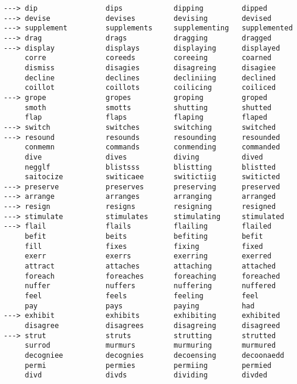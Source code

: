 \begin{lstlisting}
---> dip            	dips           	dipping        	dipped         	
---> devise         	devises        	devising       	devised        	
---> supplement     	supplements    	supplementing  	supplemented   	
---> drag           	drags          	dragging       	dragged        	
---> display        	displays       	displaying     	displayed      	
     corre          	coreeds        	coreeing       	coarned        	
     dismiss        	disagies       	disagreing     	disagiee       	
     decline        	declines       	decliniing     	declined       	
     coillot        	coillots       	coilicing      	coiliced       	
---> grope          	gropes         	groping        	groped         	
     smoth          	smotts         	shutting       	shutted        	
     flap           	flaps          	flaping        	flaped         	
---> switch         	switches       	switching      	switched       	
---> resound        	resounds       	resounding     	resounded      	
     conmemn        	commands       	conmending     	commanded      	
     dive           	dives          	diving         	dived          	
     negglf         	blistsss       	blistting      	blistted       	
     saitocize      	switicaee      	switictiig     	switicted      	
---> preserve       	preserves      	preserving     	preserved      	
---> arrange        	arranges       	arranging      	arranged       	
---> resign         	resigns        	resigning      	resigned       	
---> stimulate      	stimulates     	stimulating    	stimulated     	
---> flail          	flails         	flailing       	flailed        	
     befit          	beits          	befiting       	befit          	
     fill           	fixes          	fixing         	fixed          	
     exerr          	exerrs         	exerring       	exerred        	
     attract        	attaches       	attaching      	attached       	
     foreach        	foreaches      	foreaching     	foreached      	
     nuffer         	nuffers        	nuffering      	nuffered       	
     feel           	feels          	feeling        	feel           	
     pay            	pays           	paying         	had            	
---> exhibit        	exhibits       	exhibiting     	exhibited      	
     disagree       	disagrees      	disagreing     	disagreed      	
---> strut          	struts         	strutting      	strutted       	
     surrod         	murmurs        	murmuring      	murmured       	
     decogniee      	decognies      	decoensing     	decoonaedd     	
     permi          	permies        	permiing       	permied        	
     divd           	divds          	dividing       	divded         	

\end{lstlisting}
